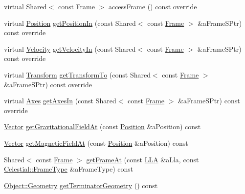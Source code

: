 \begin{DoxyCompactItemize}
virtual Shared$<$ const \hyperlink{classostk_1_1physics_1_1coord_1_1_frame}{Frame} $>$ \hyperlink{classostk_1_1physics_1_1env_1_1obj_1_1_celestial_a0140fc682a707ec2dc715828e532db79}{access\+Frame} () const override
\item 
virtual \hyperlink{classostk_1_1physics_1_1coord_1_1_position}{Position} \hyperlink{classostk_1_1physics_1_1env_1_1obj_1_1_celestial_af38fd0017fe14cfb6103684fcb1d3ee9}{get\+Position\+In} (const Shared$<$ const \hyperlink{classostk_1_1physics_1_1coord_1_1_frame}{Frame} $>$ \&a\+Frame\+S\+Ptr) const override
\item 
virtual \hyperlink{classostk_1_1physics_1_1coord_1_1_velocity}{Velocity} \hyperlink{classostk_1_1physics_1_1env_1_1obj_1_1_celestial_a748a113566d79c463e84bf62f05af83a}{get\+Velocity\+In} (const Shared$<$ const \hyperlink{classostk_1_1physics_1_1coord_1_1_frame}{Frame} $>$ \&a\+Frame\+S\+Ptr) const override
\item 
virtual \hyperlink{classostk_1_1physics_1_1coord_1_1_transform}{Transform} \hyperlink{classostk_1_1physics_1_1env_1_1obj_1_1_celestial_a8fa63af32cf8785ff6d3762d6f8dcd86}{get\+Transform\+To} (const Shared$<$ const \hyperlink{classostk_1_1physics_1_1coord_1_1_frame}{Frame} $>$ \&a\+Frame\+S\+Ptr) const override
\item 
virtual \hyperlink{classostk_1_1physics_1_1coord_1_1_axes}{Axes} \hyperlink{classostk_1_1physics_1_1env_1_1obj_1_1_celestial_a52b8cd88b947ca97f94981e5d3e10677}{get\+Axes\+In} (const Shared$<$ const \hyperlink{classostk_1_1physics_1_1coord_1_1_frame}{Frame} $>$ \&a\+Frame\+S\+Ptr) const override
\item 
\hyperlink{classostk_1_1physics_1_1data_1_1_vector}{Vector} \hyperlink{classostk_1_1physics_1_1env_1_1obj_1_1_celestial_adc8df9d860d30eb49600e644f63045bc}{get\+Gravitational\+Field\+At} (const \hyperlink{classostk_1_1physics_1_1coord_1_1_position}{Position} \&a\+Position) const
\item 
\hyperlink{classostk_1_1physics_1_1data_1_1_vector}{Vector} \hyperlink{classostk_1_1physics_1_1env_1_1obj_1_1_celestial_ae2cd7ac1cb6a896390394b77cffa0297}{get\+Magnetic\+Field\+At} (const \hyperlink{classostk_1_1physics_1_1coord_1_1_position}{Position} \&a\+Position) const
\item 
Shared$<$ const \hyperlink{classostk_1_1physics_1_1coord_1_1_frame}{Frame} $>$ \hyperlink{classostk_1_1physics_1_1env_1_1obj_1_1_celestial_a6cd5d134347840891174cff0729e53b9}{get\+Frame\+At} (const \hyperlink{classostk_1_1physics_1_1coord_1_1spherical_1_1_l_l_a}{L\+LA} \&a\+Lla, const \hyperlink{classostk_1_1physics_1_1env_1_1obj_1_1_celestial_ad005258cdc5969759c8a516fb1cfd262}{Celestial\+::\+Frame\+Type} \&a\+Frame\+Type) const
\item 
\hyperlink{classostk_1_1physics_1_1env_1_1_object_a66e44a65aefb23a184a6de531e96935d}{Object\+::\+Geometry} \hyperlink{classostk_1_1physics_1_1env_1_1obj_1_1_celestial_a4c594d934cf5c6a25795d6a992ea564f}{get\+Terminator\+Geometry} () const
\end{DoxyCompactItemize}
